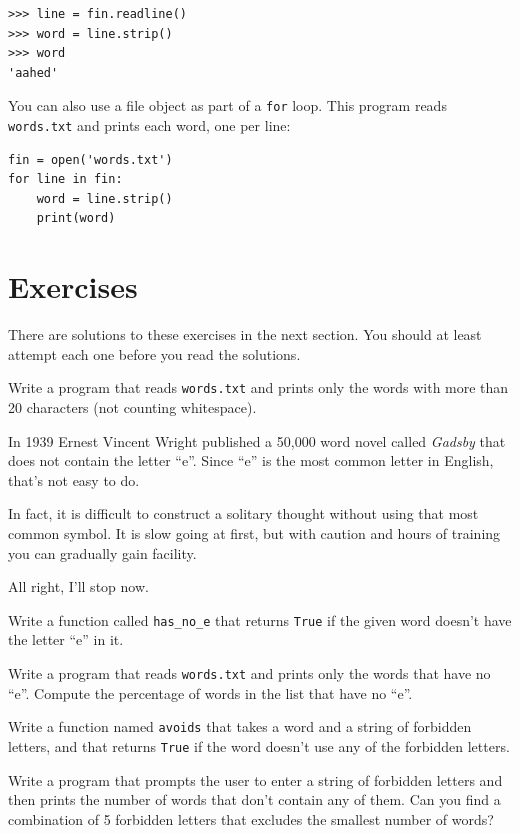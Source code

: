 \documentclass[10pt]{book}
\begin{document}
\begin{verbatim}
>>> line = fin.readline()
>>> word = line.strip()
>>> word
'aahed'
\end{verbatim}
%
You can also use a file object as part of a {\tt for} loop.
This program reads {\tt words.txt} and prints each word, one
per line:

\begin{verbatim}
fin = open('words.txt')
for line in fin:
    word = line.strip()
    print(word)
\end{verbatim}
%

\section{Exercises}

There are solutions to these exercises in the next section.
You should at least attempt each one before you read the solutions.

\begin{exercise}
Write a program that reads {\tt words.txt} and prints only the
words with more than 20 characters (not counting whitespace).

\end{exercise}

\begin{exercise}

In 1939 Ernest Vincent Wright published a 50,000 word novel called
{\em Gadsby} that does not contain the letter ``e''.  Since ``e'' is
the most common letter in English, that's not easy to do.

In fact, it is difficult to construct a solitary thought without using
that most common symbol.  It is slow going at first, but with caution
and hours of training you can gradually gain facility.

All right, I'll stop now.

Write a function called \verb"has_no_e" that returns {\tt True} if
the given word doesn't have the letter ``e'' in it.

Write a program that reads {\tt words.txt} and prints only the words
that have no ``e''.  Compute the percentage of words in the list
that have no ``e''.

\end{exercise}


\begin{exercise}

Write a function named {\tt avoids}
that takes a word and a string of forbidden letters, and
that returns {\tt True} if the word doesn't use any of the forbidden
letters.

Write a program that prompts the user to enter a string
of forbidden letters and then prints the number of words that
don't contain any of them.
Can you find a combination of 5 forbidden letters that
excludes the smallest number of words?

\end{exercise}
\end{document}
